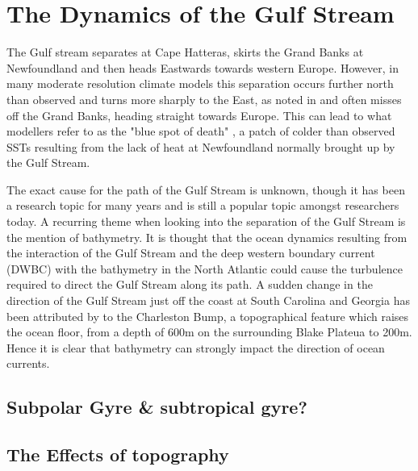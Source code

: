 \documentclass[..\EOYR.tex]{subfiles}
\begin{document}
\section{The Dynamics of the Gulf Stream}

The Gulf stream separates at Cape Hatteras, skirts the Grand Banks at Newfoundland and then heads Eastwards towards western Europe. However, in many moderate resolution climate models this separation occurs further north than observed and turns more sharply to the East, as noted in \citep{Hurlburt2008} and often misses off the Grand Banks, heading straight towards Europe. This can lead to what modellers refer to as the "blue spot of death" \citep{Gnanadesikan2007}, a patch of colder than observed SSTs resulting from the lack of heat at Newfoundland normally brought up by the Gulf Stream.

The exact cause for the path of the Gulf Stream is unknown, though it has been a research topic for many years and is still a popular topic amongst researchers today. A recurring theme when looking into the separation of the Gulf Stream is the mention of bathymetry. It is thought \citep{Gula2014}\citep{NaveiraGarabato2013}\citep{Nikurashin2012a} that the ocean dynamics resulting from the interaction of the Gulf Stream and the deep western boundary current (DWBC) with the bathymetry in the North Atlantic could cause the turbulence required to direct the Gulf Stream along its path. A sudden change in the direction of the Gulf Stream just off the coast at South Carolina and Georgia has been attributed by \citep{Gula2014} to the Charleston Bump, a topographical feature which raises the ocean floor, from a depth of 600m on the surrounding Blake Plateua to 200m. Hence it is clear that bathymetry can strongly impact the direction of ocean currents.


\subsection{Subpolar Gyre \& subtropical gyre?}

\subsection{The Effects of topography}
\end{document}
